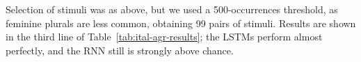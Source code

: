 Selection of stimuli was as above, but we used a 500-occurrences
threshold, as feminine plurals are less common, obtaining 99 pairs of stimuli. %
Results are shown in the third line of Table~\ref{tab:ital-agr-results}; the LSTMs perform almost perfectly, and the RNN still is strongly above chance.

